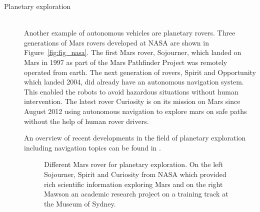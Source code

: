 \begin{description}
\item[Planetary exploration]\hfill \\
Another example of autonomous vehicles are planetary rovers.
Three generations of Mars rovers developed at NASA are shown in Figure~\ref{fig:fig_nasa}. 
The first Mars rover, Sojourner, which landed on Mars in 1997 as part of the Mars Pathfinder Project was remotely operated from earth. 
The next generation of rovers, Spirit and Opportunity which landed 2004, did already have an autonomous navigation system. This enabled the robots to avoid hazardous situations without human intervention. 
The latest rover Curiosity is on its mission on Mars since August 2012 using autonomous navigation to explore mars on safe paths without the help of human rover drivers.

An overview of recent developments in the field of planetary exploration including navigation topics can be found in \cite{PavoneAcikmese2014rover}.

\begin{figure}[thpb]
	  \myfloatalign
      \footnotesize
      \centering
   \caption[Mars rover]{Different Mars rover for planetary exploration. On the left Sojourner, Spirit and Curiosity from NASA which provided rich scientific information exploring Mars and on the right Mawson an academic research project on a training track at the Museum of Sydney.}
   \label{fig:fig_rovers}
\end{figure}


\end{description}
